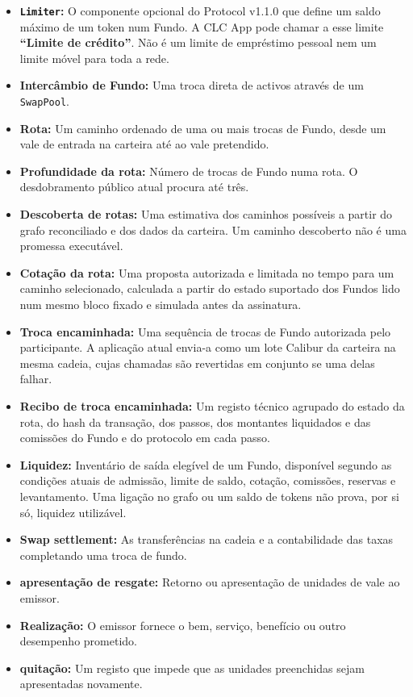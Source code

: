 \documentclass[11pt]{article}
\begin{document}
\begin{itemize}[leftmargin=*]
\item \textbf{\texttt{Limiter}:} O componente opcional do Protocol v1.1.0 que define um saldo máximo de um token num Fundo. A CLC App pode chamar a esse limite \textbf{``Limite de crédito''}. Não é um limite de empréstimo pessoal nem um limite móvel para toda a rede.
\item \textbf{Intercâmbio de Fundo:} Uma troca direta de activos através de um \texttt{SwapPool}.
\item \textbf{Rota:} Um caminho ordenado de uma ou mais trocas de Fundo, desde um vale de entrada na carteira até ao vale pretendido.
\item \textbf{Profundidade da rota:} Número de trocas de Fundo numa rota. O desdobramento público atual procura até três.
\item \textbf{Descoberta de rotas:} Uma estimativa dos caminhos possíveis a partir do grafo reconciliado e dos dados da carteira. Um caminho descoberto não é uma promessa executável.
\item \textbf{Cotação da rota:} Uma proposta autorizada e limitada no tempo para um caminho selecionado, calculada a partir do estado suportado dos Fundos lido num mesmo bloco fixado e simulada antes da assinatura.
\item \textbf{Troca encaminhada:} Uma sequência de trocas de Fundo autorizada pelo participante. A aplicação atual envia-a como um lote Calibur da carteira na mesma cadeia, cujas chamadas são revertidas em conjunto se uma delas falhar.
\item \textbf{Recibo de troca encaminhada:} Um registo técnico agrupado do estado da rota, do hash da transação, dos passos, dos montantes liquidados e das comissões do Fundo e do protocolo em cada passo.
\item \textbf{Liquidez:} Inventário de saída elegível de um Fundo, disponível segundo as condições atuais de admissão, limite de saldo, cotação, comissões, reservas e levantamento. Uma ligação no grafo ou um saldo de tokens não prova, por si só, liquidez utilizável.
\item \textbf{Swap settlement:} As transferências na cadeia e a contabilidade das taxas completando uma troca de fundo.
\item \textbf{apresentação de resgate:} Retorno ou apresentação de unidades de vale ao emissor.
\item \textbf{Realização:} O emissor fornece o bem, serviço, benefício ou outro desempenho prometido.
\item \textbf{quitação:} Um registo que impede que as unidades preenchidas sejam apresentadas novamente.

\end{itemize}
\end{document}
